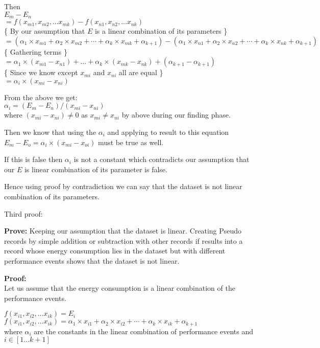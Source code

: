 Then\\
\(E_m - E_n\)\\
\(= f(x_{m1}, x_{m2}, \ldots x_{mk}) - f(x_{n1}, x_{n2}, \ldots x_{nk})\)\\
{\footnotesize \{ By our assumption that \(E\) is a linear combination of its parameters \} }\\
\(= (\alpha _1\times x_{m1} + \alpha_2\times x_{m2} + \cdots + \alpha_k\times x_{mk} + \alpha_{k+1}) - (\alpha _1\times x_{n1} + \alpha_2\times x_{n2} + \cdots + \alpha_k\times x_{nk} + \alpha_{k+1})\)\\
{\footnotesize \{ Gathering terms \}}\\
\(= \alpha_1 \times (x_{m1} - x_{n1}) + \ldots + \alpha_k \times (x_{mk} - x_{nk}) + (\alpha_{k+1} - \alpha_{k+1})\)\\
{\footnotesize \{ Since we know except \(x_{mi}\) and \(x_{ni}\) all are equal \}}\\
\(= \alpha_i \times (x_{mi} - x_{ni})\)

From the above we get:\\
\(\alpha_i = (E_m - E_n)/(x_{mi} - x_{ni})\)\\
where \((x_{mi} - x_{ni}) \neq 0\) as \(x_{mi} \neq x_{ni}\) by above during our finding phase.

Then we know that using the \(\alpha_i\) and applying to result to this equation \(E_m - E_o = \alpha_i \times (x_{mi} - x_{oi})\) must be true as well.

If this is false then \(\alpha_i\) is not a constant which contradicts our assumption that our \(E\) is linear combination of its parameter is false.

Hence using proof by contradiction we can say that the dataset is not linear combination of its parameters.

\newpage

Third proof:

\textbf{Prove:} Keeping our assumption that the dataset is linear. Creating Pseudo records by simple addition or subtraction with other records if results into a record whose energy consumption lies in the dataset but with different performance events shows that the dataset is not linear.

\textbf{Proof:}\\Let us assume that the energy consumption is a linear combination of the performance events.

\(f(x_{i1}, x_{i2}, \ldots x_{ik}) = E_i\)\\
\(f(x_{i1}, x_{i2}, \ldots x_{ik}) = \alpha _1\times x_{i1} + \alpha_2\times x_{i2} + \cdots + \alpha_k\times x_{ik} + \alpha_{k+1}\)\\
where \(\alpha_i\) are the constants in the linear combination of performance events and \(i\in[1\ldots k+1]\)

